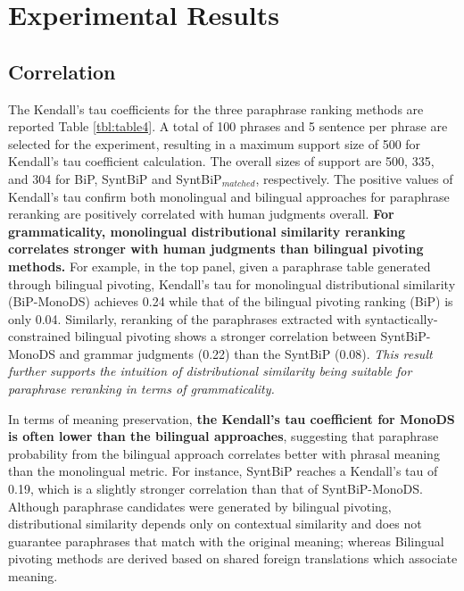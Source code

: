 \documentclass[11pt]{article}
\newcommand{\mnote}[1]{\marginpar{\raggedleft\footnotesize\itshape#1}}
\begin{document}
\section{Experimental Results\vspace{-.12cm}}
\label{sect:results_fr_en}

\subsection{Correlation}
The Kendall's tau coefficients for the three paraphrase ranking methods are reported Table \ref{tbl:table4}. A total of 100 phrases and 5 sentence per phrase are selected for the experiment, resulting in a maximum support size of 500 for Kendall's tau coefficient calculation. The overall sizes of support are 500, 335, and 304 for BiP, SyntBiP and SyntBiP$_{matched}$, respectively. The positive values of Kendall's tau confirm both monolingual and bilingual approaches for paraphrase reranking are positively correlated with human judgments overall. \textbf{For grammaticality, monolingual distributional similarity reranking correlates stronger with human judgments than bilingual pivoting methods.} For example, in the top panel, given a paraphrase table generated through bilingual pivoting, Kendall's tau for monolingual distributional similarity (BiP-MonoDS) achieves 0.24 while that of the bilingual pivoting ranking (BiP) is only 0.04. Similarly, reranking of the paraphrases extracted with syntactically-constrained bilingual pivoting shows a stronger correlation between SyntBiP-MonoDS and grammar judgments (0.22) than the SyntBiP (0.08). \emph{This result further supports the intuition of distributional similarity being suitable for paraphrase reranking in terms of grammaticality.} %

In terms of meaning preservation, \textbf{the Kendall's tau coefficient for MonoDS is often lower than the bilingual approaches}, suggesting that paraphrase probability from the bilingual approach correlates better with phrasal meaning than the monolingual metric. For instance, SyntBiP reaches a Kendall's tau of 0.19, which is a slightly stronger correlation than that of SyntBiP-MonoDS. Although paraphrase candidates were generated by bilingual pivoting, distributional similarity depends only on contextual similarity and does not guarantee paraphrases that match with the original meaning; whereas Bilingual pivoting methods are derived based on %
shared foreign translations which associate meaning. 
\end{document}
